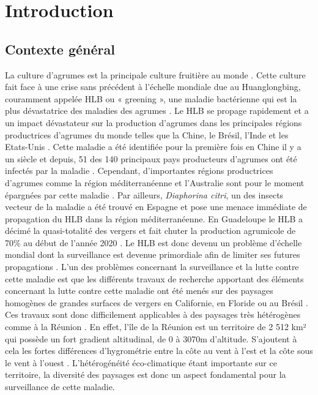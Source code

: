 \documentclass[
  11pt,
  french,
  a4paper,
  extrafontsizes,onecolumn,openright
  ]{memoir}
\begin{document}
\mainmatter

\hypertarget{introduction}{%
\chapter{Introduction}\label{introduction}}

\vspace*{4cm}

\hypertarget{contexte-guxe9nuxe9ral}{%
\section{Contexte général}\label{contexte-guxe9nuxe9ral}}

La culture d'agrumes est la principale culture fruitière au monde \autocite{comte_apport_2013}. Cette culture fait face à une crise sans précédent à l'échelle mondiale due au Huanglongbing, couramment appelée HLB ou « greening », une maladie bactérienne qui est la plus dévastatrice des maladies des agrumes \autocite{moriya_detecting_2019}. Le HLB se propage rapidement et a un impact dévastateur sur la production d'agrumes dans les principales régions productrices d'agrumes du monde telles que la Chine, le Brésil, l'Inde et les Etats-Unis \autocite{deng_detection_2020}. Cette maladie a été identifiée pour la première fois en Chine il y a un siècle et depuis, 51 des 140 principaux pays producteurs d'agrumes ont été infectés par la maladie \autocite{moriya_detecting_2019}. Cependant, d'importantes régions productrices d'agrumes comme la région méditerranéenne et l'Australie sont pour le moment épargnées par cette maladie \autocite{gutierrez_prospective_2013}. Par ailleurs, \emph{Diaphorina citri}, un des insects vecteur de la maladie a été trouvé en Espagne et pose une menace immédiate de propagation du HLB dans la région méditerranéenne. En Guadeloupe le HLB a décimé la quasi-totalité des vergers et fait chuter la production agrumicole de 70\% au début de l'année 2020 \autocite{morillon_huanglongbing_2020}. Le HLB est donc devenu un problème d'échelle mondial dont la surveillance est devenue primordiale afin de limiter ses futures propagations \autocite{wang_citrus_2019}.
\vfill
\newpage
L'un des problèmes concernant la surveillance et la lutte contre cette maladie est que les différents travaux de recherche apportant des éléments concernant la lutte contre cette maladie ont été menés sur des paysages homogènes de grandes surfaces de vergers en Californie, en Floride ou au Brésil \autocite{narouei-khandan_global_2016}.
Ces travaux sont donc difficilement applicables à des paysages très hétérogènes comme à la Réunion \autocite{gottwald_current_2010}.
En effet, l'île de la Réunion est un territoire de 2 512 km² qui possède un fort gradient altitudinal, de 0 à 3070m d'altitude. S'ajoutent à cela les fortes différences d'hygrométrie entre la côte au vent à l'est et la côte sous le vent à l'ouest \autocite{guilloteau_utilisation_2018}. L'hétérogénéité éco-climatique étant importante sur ce territoire, la diversité des paysages est donc un aspect fondamental pour la surveillance de cette maladie.
\end{document}
